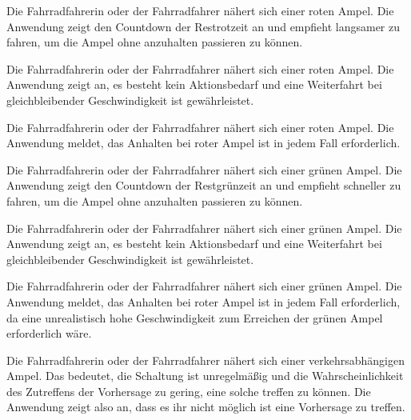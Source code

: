 \begin{description}[leftmargin=0.7cm,style=nextline]
\item[Szenario R1:] 
Die Fahrradfahrerin oder der Fahrradfahrer nähert sich einer roten Ampel. Die Anwendung zeigt den Countdown der Restrotzeit an und empfieht langsamer zu fahren, um die Ampel ohne anzuhalten passieren zu können.  \\
\item[Szenario R2:] 
Die Fahrradfahrerin oder der Fahrradfahrer nähert sich einer roten Ampel. Die Anwendung zeigt an, es besteht kein Aktionsbedarf und eine Weiterfahrt bei gleichbleibender Geschwindigkeit ist gewährleistet. \\
\item[Szenario R3:] 
Die Fahrradfahrerin oder der Fahrradfahrer nähert sich einer roten Ampel. Die Anwendung meldet, das Anhalten bei roter Ampel ist in jedem Fall erforderlich.\\
\item[Szenario G1:] 
Die Fahrradfahrerin oder der Fahrradfahrer nähert sich einer grünen Ampel. Die Anwendung zeigt den Countdown der Restgrünzeit an und empfieht schneller zu fahren, um die Ampel ohne anzuhalten passieren zu können.\\
\item[Szenario G2:] 
Die Fahrradfahrerin oder der Fahrradfahrer nähert sich einer grünen Ampel. Die Anwendung zeigt an, es besteht kein Aktionsbedarf und eine Weiterfahrt bei gleichbleibender Geschwindigkeit ist gewährleistet.\\ 
\item[Szenario G3:] 
Die Fahrradfahrerin oder der Fahrradfahrer nähert sich einer grünen Ampel. Die Anwendung meldet, das Anhalten bei roter Ampel ist in jedem Fall erforderlich, da eine unrealistisch hohe Geschwindigkeit zum Erreichen der grünen Ampel erforderlich wäre.\\
\item[Szenario V1:] 
Die Fahrradfahrerin oder der Fahrradfahrer nähert sich einer verkehrsabhängigen Ampel. Das bedeutet, die Schaltung ist unregelmäßig und die Wahrscheinlichkeit des Zutreffens der Vorhersage zu gering, eine solche treffen zu können. Die Anwendung zeigt also an, dass es ihr nicht möglich ist eine Vorhersage zu treffen.\\ 
\end{description} %
